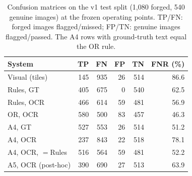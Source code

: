 \begin{table}[!t]
\caption{Confusion matrices on the v1 test split (1{,}080 forged, 540 genuine images) at the frozen operating points. TP/FN: forged images flagged/missed; FP/TN: genuine images flagged/passed. The A4 rows with ground-truth text equal the OR rule.}
\label{tab:confusion}
\centering
\scriptsize
\setlength{\tabcolsep}{4pt}
\renewcommand{\arraystretch}{1.06}
\begin{tabular}{@{}l r r r r r@{}}
\toprule
System & TP & FN & FP & TN & FNR (\%) \\
\midrule
Visual (tiles) & 145 & 935 & 26 & 514 & 86.6 \\
Rules, GT & 405 & 675 & 0 & 540 & 62.5 \\
Rules, OCR & 466 & 614 & 59 & 481 & 56.9 \\
OR, OCR & 580 & 500 & 83 & 457 & 46.3 \\
A4, GT & 527 & 553 & 26 & 514 & 51.2 \\
A4, OCR & 237 & 843 & 22 & 518 & 78.1 \\
A4, OCR, $=$Rules & 516 & 564 & 59 & 481 & 52.2 \\
A5, OCR (post-hoc) & 390 & 690 & 27 & 513 & 63.9 \\
\bottomrule
\end{tabular}
\end{table}

